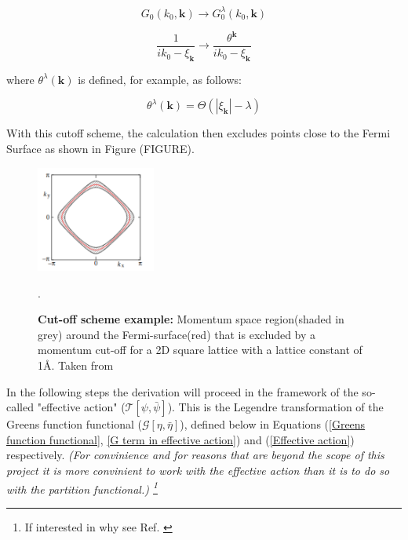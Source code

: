 \documentclass[12pt]{article}
\begin{document}
\begin{equation} \label{propagator transform 1}
    G_0(k_0, \textbf{k}) \rightarrow G_0^{\lambda}(k_0, \textbf{k})
\end{equation}


\begin{equation} \label{propagator transform 2}
    \frac{1}{ik_0 - \xi_{\textbf{k}}} \rightarrow \frac{\theta^{\textbf{k}}}{ik_0 - \xi_{\textbf{k}}}
\end{equation}

\noindent where $\theta^{\lambda}(\textbf{k})$ is defined, for example, as follows:

\begin{equation} \label{theta def}
    \theta^{\lambda}(\textbf{k}) = \Theta(|\xi_{\textbf{k}}| - \lambda)    
\end{equation}

\noindent With this cutoff scheme, the calculation then excludes points close to the Fermi Surface as shown in Figure (FIGURE). \par
\begin{figure}[htbp]  %
    \centering
    \includegraphics[width=0.35\textwidth]{Truncation.png}  %
    \caption{\textbf{Cut-off scheme example:} Momentum space region(shaded in grey) around the Fermi-surface(red) that is excluded 
    by a momentum cut-off for a 2D square lattice with a lattice constant of 1\AA. Taken from \cite {metzner2012functional}}.
    \label{fig:Truncation}
\end{figure}

\medskip
\noindent In the following steps the derivation will proceed in the framework of the  so-called "effective action" ($\mathcal{T}[\psi, \bar{\psi}]$).
This is the Legendre transformation of the Greens function functional ($\mathcal{G}[\eta, \bar{\eta}]$), defined below in Equations (\ref{Greens function functional}, \ref{G term in effective action}) and (\ref{Effective action}) respectively. 
\textit{(For convinience and for reasons that
are beyond the scope of this project it is more convinient to work with the effective action than it is to do so with the partition functional.) \footnote{If interested in why see Ref. \cite{metzner2012functional}}}
\end{document}
